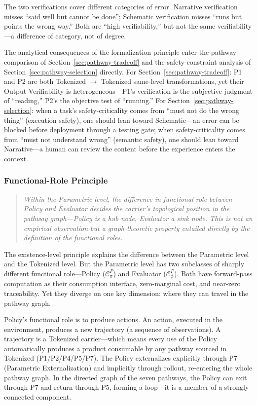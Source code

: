 The two verifications cover different categories of error. Narrative verification misses ``said well but cannot be done''; Schematic verification misses ``runs but points the wrong way.'' Both are ``high verifiability,'' but not the same verifiability---a difference of category, not of degree.

The analytical consequences of the formalization principle enter the pathway comparison of Section~\ref{sec:pathway-tradeoff} and the safety-constraint analysis of Section~\ref{sec:pathway-selection} directly. For Section~\ref{sec:pathway-tradeoff}: P1 and P2 are both Tokenized $\rightarrow$ Tokenized same-level transformations, yet their Output Verifiability is heterogeneous---P1's verification is the subjective judgment of ``reading,'' P2's the objective test of ``running.'' For Section~\ref{sec:pathway-selection}: when a task's safety-criticality comes from ``must not do the wrong thing'' (execution safety), one should lean toward Schematic---an error can be blocked before deployment through a testing gate; when safety-criticality comes from ``must not understand wrong'' (semantic safety), one should lean toward Narrative---a human can review the content before the experience enters the context.

\subsubsection{Functional-Role Principle}
\label{sec:functional-role-principle}

\begin{quote}\itshape
Within the Parametric level, the difference in functional role between Policy and Evaluator decides the carrier's topological position in the pathway graph---Policy is a hub node, Evaluator a sink node. This is not an empirical observation but a graph-theoretic property entailed directly by the definition of the functional roles.
\end{quote}

The existence-level principle explains the difference between the Parametric level and the Tokenized level. But the Parametric level has two subclasses of sharply different functional role---Policy ($\mathcal{C}^P_\pi$) and Evaluator ($\mathcal{C}^P_\phi$). Both have forward-pass computation as their consumption interface, zero-marginal cost, and near-zero traceability. Yet they diverge on one key dimension: where they can travel in the pathway graph.

Policy's functional role is to produce actions. An action, executed in the environment, produces a new trajectory (a sequence of observations). A trajectory is a Tokenized carrier---which means every use of the Policy automatically produces a product consumable by any pathway sourced in Tokenized (P1/P2/P4/P5/P7). The Policy externalizes explicitly through P7 (Parametric Externalization) and implicitly through rollout, re-entering the whole pathway graph. In the directed graph of the seven pathways, the Policy can exit through P7 and return through P5, forming a loop---it is a member of a strongly connected component.

